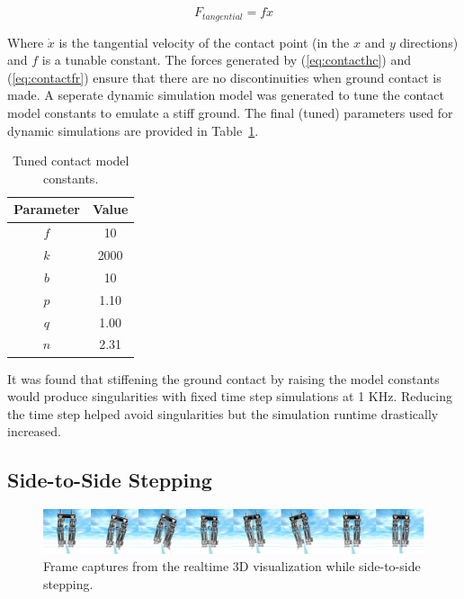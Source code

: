 \begin{equation}
	\label{eq:contactfr}
	{F_{tangential}} = f{\dot x}
\end{equation}

Where $\dot x$ is the tangential velocity of the contact point (in the $x$ and $y$ directions) and $f$ is a tunable constant. The forces generated by (\ref{eq:contacthc}) and (\ref{eq:contactfr}) ensure that there are no discontinuities when ground contact is made. A seperate dynamic simulation model was generated to tune the contact model constants to emulate a stiff ground. The final (tuned) parameters used for dynamic simulations are provided in Table~\ref{tab:contactk}.

\begin{table}[!h]
  \centering
  \caption{Tuned contact model constants.}
    \begin{tabular}{cc}
    \addlinespace
    \toprule
    \textbf{Parameter} & \textbf{Value}\\
    \midrule
	$f$	&	10 \\
    $k$	&	2000 \\
    $b$	&	10 \\
    $p$	&	1.10 \\
    $q$  &	1.00 \\
    $n$	&	2.31 \\
    \bottomrule
    \end{tabular}
  \label{tab:contactk}
\end{table}

It was found that stiffening the ground contact by raising the model constants would produce singularities with fixed time step simulations at 1 KHz. Reducing the time step helped avoid singularities but the simulation runtime drastically increased. 

\subsection{Side-to-Side Stepping} %
\label{sub:3d_simulations}

\begin{figure}[!h]
	\centering
    \includegraphics[scale=0.095]{fig/simulations/sidesequence.png}
  	\caption{Frame captures from the realtime 3D visualization while side-to-side stepping.}
	\label{fig:sidesequence}
\end{figure}

